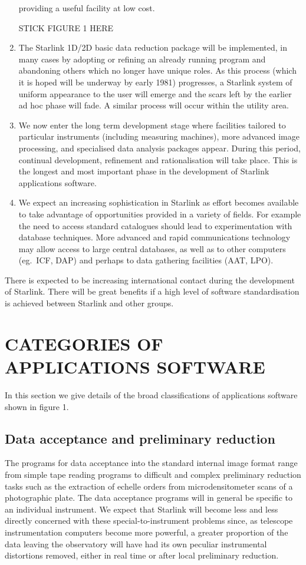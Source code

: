 \begin{enumerate}
providing a useful facility at low cost.
\newpage
\vspace{110mm}
\begin{center}
STICK FIGURE 1 HERE
\end{center}
\newpage
\item The Starlink 1D/2D basic data reduction package will be implemented, in
many cases by adopting or refining an already running program and abandoning
others which no longer have unique roles.
As this process (which it is hoped will be underway by early 1981) progresses,
a Starlink system of uniform appearance to the user will emerge and the scars
left by the earlier ad hoc phase will fade.
A similar process will occur within the utility area.
\item We now enter the long term development stage where facilities tailored to
particular instruments (including measuring machines), more advanced image
processing, and specialised data analysis packages appear.
During this period, continual development, refinement and rationalisation will
take place.
This is the longest and most important phase in the development of Starlink
applications software.
\item We expect an increasing sophistication in Starlink as effort becomes
available to take advantage of opportunities provided in a variety of fields.
For example the need to access standard catalogues should lead to
experimentation with database techniques.
More advanced and rapid communications technology may allow access to large
central databases, as well as to other computers (eg.\ ICF, DAP) and perhaps to
data gathering facilities (AAT, LPO).
\end{enumerate}
There is expected to be increasing international contact during the development
of Starlink.
There will be great benefits if a high level of software standardisation is
achieved between Starlink and other groups.
\section {CATEGORIES OF APPLICATIONS SOFTWARE}
In this section we give details of the broad classifications of applications
software shown in figure 1.
\subsection {Data acceptance and preliminary reduction}
The programs for data acceptance into the standard internal image format range
from simple tape reading programs to difficult and complex preliminary
reduction tasks such as the extraction of echelle orders from microdensitometer
scans of a photographic plate.
The data acceptance programs will in general be specific to an individual
instrument.
We expect that Starlink will become less and less directly concerned with these
special-to-instrument problems since, as telescope instrumentation computers
become more powerful, a greater proportion of the data leaving the observatory
will have had its own peculiar instrumental distortions removed, either in real
time or after local preliminary reduction.

